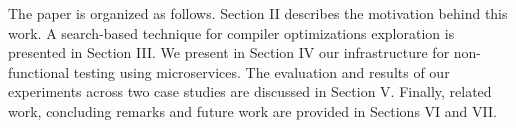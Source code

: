 The paper is organized as follows.
Section II describes the motivation behind this work. A search-based technique for compiler optimizations exploration is presented in Section III. 
We present in Section IV our infrastructure for non-functional testing using microservices.  The evaluation and results of our experiments across two case studies are discussed in Section V. 
Finally, related work, concluding remarks and future work are provided in Sections VI and VII.




 
 

